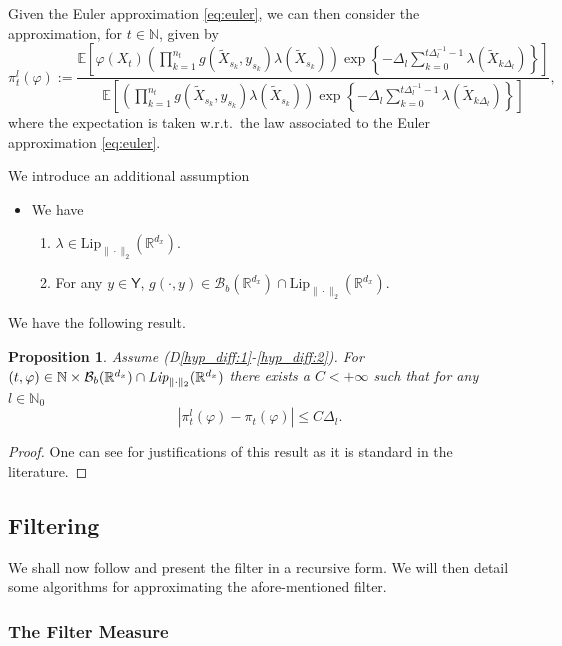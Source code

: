 \documentclass[english]{article}
\newtheorem{prop}{Proposition}[section]
\newcounter{hypD}
\newenvironment{hypD}{\refstepcounter{hypD}\begin{itemize}
 \item[({\bf D\arabic{hypD}})]}{\end{itemize}}
\begin{document}
Given the Euler approximation \eqref{eq:euler}, we can then consider the approximation, for $t\in\mathbb{N}$, given by
\begin{equation}\label{eq:cont_filter_euler}
\pi_t^l(\varphi) := \frac{
\mathbb{E}\left[\varphi(X_t)\left(\prod_{k=1}^{n_t} g(\widetilde{X}_{s_k},y_{s_k})\lambda(\widetilde{X}_{s_k})\right)
\exp\left\{-\Delta_l\sum_{k=0}^{t\Delta_l^{-1}-1}\lambda(\widetilde{X}_{k\Delta_l})\right\}
\right]
}{\mathbb{E}\left[\left(\prod_{k=1}^{n_t} g(\widetilde{X}_{s_k},y_{s_k})\lambda(\widetilde{X}_{s_k})\right)
\exp\left\{-\Delta_l\sum_{k=0}^{t\Delta_l^{-1}-1}\lambda(\widetilde{X}_{k\Delta_l})\right\}
\right]},
\end{equation}
where the expectation is taken w.r.t.~the law associated to the Euler approximation \eqref{eq:euler}.

We introduce an additional assumption
\begin{hypD}\label{hyp_diff:2}
We have
\begin{enumerate}
\item{$\lambda\in\textrm{Lip}_{\|\cdot\|_2}(\mathbb{R}^{d_x})$.}
\item{For any $y\in\mathsf{Y}$, $g(\cdot,y)\in\mathcal{B}_b(\mathbb{R}^{d_x})\cap\textrm{Lip}_{\|\cdot\|_2}(\mathbb{R}^{d_x})$.}
\end{enumerate}
\end{hypD}
We have the following result.
\begin{prop}\label{prop:weak_error}
Assume (D\ref{hyp_diff:1}-\ref{hyp_diff:2}). For $(t,\varphi)\in\mathbb{N}\times\mathcal{B}_b(\mathbb{R}^{d_x})\cap\textrm{\emph{Lip}}_{\|\cdot\|_2}(\mathbb{R}^{d_x})$ there exists a $C<+\infty$ such that for any $l\in\mathbb{N}_0$
$$
|\pi_t^l(\varphi)-\pi_t(\varphi)| \leq C\Delta_l.
$$
\end{prop}
\begin{proof}
One can see \cite{crisan_bain,kloeden} for justifications of this result as it is standard in the literature.
\end{proof}

\subsection{Filtering}

We shall now follow \cite{jasra} and present the filter in a recursive form. We will then detail some algorithms for approximating the afore-mentioned filter.

\subsubsection{The Filter Measure}\label{sec:disc_filter}
\end{document}
